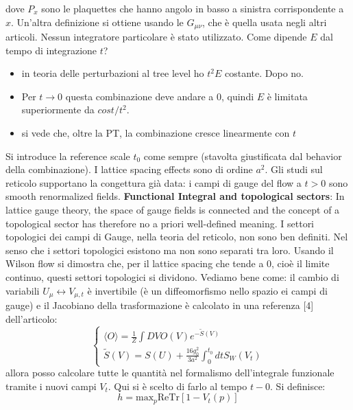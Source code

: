 \documentclass[12pt,a4paper,openright]{article}
\newcommand{\la}{\langle}
\newcommand{\ra}{\rangle}
\begin{document}
dove $P_x$ sono le plaquettes che hanno angolo in basso a sinistra corrispondente a $x$. Un'altra definizione si ottiene usando le $G_{\mu\nu}$, che è quella usata negli altri articoli.
Nessun integratore particolare è stato utilizzato. Come dipende $E$ dal tempo di integrazione $t$?
\begin{itemize}
  \item in teoria delle perturbazioni al tree level ho $t^2E$ costante. Dopo no.
  \item Per $t\rightarrow 0$ questa combinazione deve andare a 0, quindi $E$ è limitata superiormente da $cost/t^2$.
  \item si vede che, oltre la PT, la combinazione cresce linearmente con $t$
\end{itemize}
Si introduce la reference scale $t_0$ come sempre (stavolta giustificata dal behavior della combinazione).
I lattice spacing effects sono di ordine $a^2$.
\newline
Gli studi sul reticolo supportano la congettura già data: i campi di gauge del flow a $t>0$ sono smooth renormalized fields.
\newline
\newline
{\bf Functional Integral and topological sectors}: \newline
In lattice gauge theory, the space of gauge fields is connected and the concept of a
topological sector has therefore no a priori well-defined meaning.
I settori topologici dei campi di Gauge, nella teoria del reticolo, non sono ben definiti. Nel senso che i settori topologici esistono ma non sono separati tra loro.
Usando il Wilson flow si dimostra che, per il lattice spacing che tende a 0, cioè il limite continuo, questi settori topologici si dividono.
Vediamo bene come:
il cambio di variabili $U_\mu \leftrightarrow V_{\mu,t}$ è invertibile (è un diffeomorfismo nello spazio ei campi di gauge) e il Jacobiano della trasformazione è calcolato in una referenza [4] dell'articolo:
\begin{equation*}
  \begin{cases}
    \la O \ra = \frac{1}{Z} \int DV O(V) e^{-\tilde{S}(V)}
    \\
    \tilde{S}(V) = S(U) + \frac{16g_0^2}{3a^2}\int_0^{t_0} dt S_W(V_t)
  \end{cases}
\end{equation*}
allora posso calcolare tutte le quantità nel formalismo dell'integrale funzionale tramite i nuovi campi $V_t$.
Qui si è scelto di farlo al tempo $t-0$.
Si definisce:
\begin{equation*}
  h = \text{max}_p \text{Re} \text{Tr} \left[ 1 - V_t(p) \right] 
\end{equation*}
\end{document}
